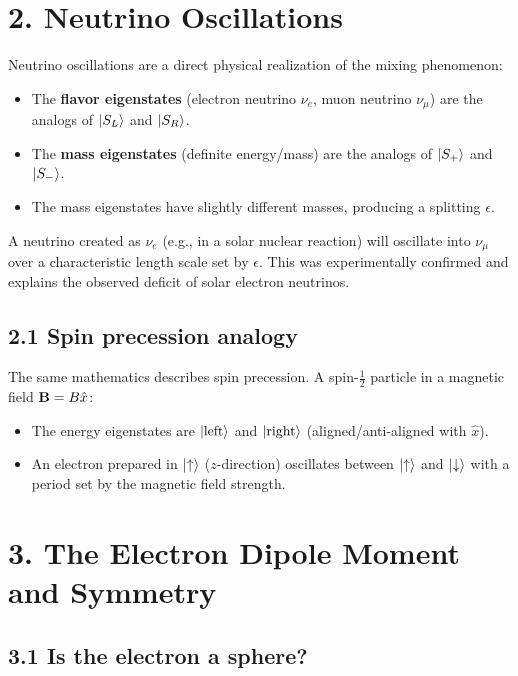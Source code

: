 \documentclass[12pt,a4paper]{article}
\begin{document}
\section{2. Neutrino Oscillations}

Neutrino oscillations are a direct physical realization of the mixing phenomenon:
\begin{itemize}[nosep]
    \item The \textbf{flavor eigenstates} (electron neutrino $\nu_e$, muon neutrino $\nu_\mu$) are the analogs of $\ket{S_L}$ and $\ket{S_R}$.
    \item The \textbf{mass eigenstates} (definite energy/mass) are the analogs of $\ket{S_+}$ and $\ket{S_-}$.
    \item The mass eigenstates have slightly different masses, producing a splitting $\epsilon$.
\end{itemize}

A neutrino created as $\nu_e$ (e.g., in a solar nuclear reaction) will oscillate into $\nu_\mu$ over a characteristic length scale set by $\epsilon$.  This was experimentally confirmed and explains the observed deficit of solar electron neutrinos.

\subsection{2.1 Spin precession analogy}

The same mathematics describes spin precession.  A spin-$\frac{1}{2}$ particle in a magnetic field $\vb{B} = B\hat{x}$:
\begin{itemize}[nosep]
    \item The energy eigenstates are $\ket{\text{left}}$ and $\ket{\text{right}}$ (aligned/anti-aligned with $\hat{x}$).
    \item An electron prepared in $\ket{\uparrow}$ ($z$-direction) oscillates between $\ket{\uparrow}$ and $\ket{\downarrow}$ with a period set by the magnetic field strength.
\end{itemize}

\section{3. The Electron Dipole Moment and Symmetry}

\subsection{3.1 Is the electron a sphere?}
\end{document}
